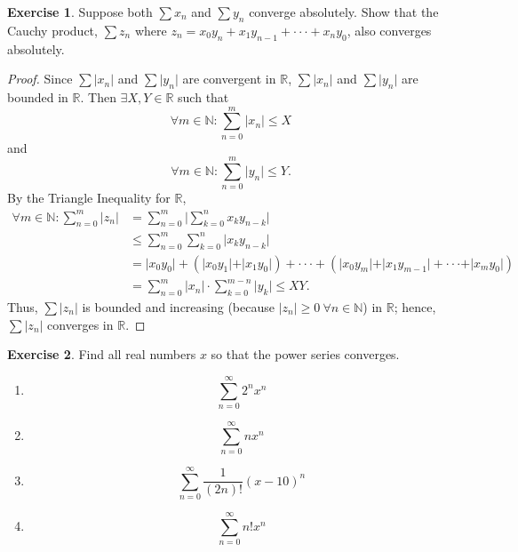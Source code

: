 \documentclass[12pt]{article}
\theoremstyle{definition}
\newtheorem{exercise}{Exercise}
\begin{document}
\thispagestyle{firstpage}

\begin{exercise}
    Suppose both \(\sum x_n\) and \(\sum y_n\) converge absolutely. Show that the Cauchy product, \(\sum z_n\) where \(z_n = x_0y_n + x_1y_{n - 1} + \cdot \cdot \cdot + x_ny_0\), also converges absolutely.  
\end{exercise}

\begin{proof}
    Since \(\sum \vert x_n \vert\) and \(\sum \vert y_n \vert\) are convergent in \(\mathbb{R}\), \(\sum \vert x_n \vert\) and \(\sum \vert y_n \vert\) are bounded in \(\mathbb{R}\). Then \(\exists X,Y \in \mathbb{R}\) such that
    \[
        \forall m \in \mathbb{N} : \sum_{n = 0}^{m}\vert x_n \vert \leq X
    \]
    and
    \[
        \forall m \in \mathbb{N} : \sum_{n = 0}^{m}\vert y_n \vert \leq Y.
    \]
    By the Triangle Inequality for \(\mathbb{R}\),
    \begin{align*}
        \forall m \in \mathbb{N} : \sum_{n = 0}^{m}\vert z_n \vert &= \sum_{n = 0}^{m}\bigg\vert \sum_{k = 0}^{n}x_ky_{n - k} \bigg\vert \\
        &\leq \sum_{n = 0}^{m}\sum_{k = 0}^{n}\vert x_ky_{n - k} \vert \\
        &= \vert x_0y_0 \vert + (\vert x_0y_1 \vert + \vert x_1y_0 \vert) + \cdot \cdot \cdot + (\vert x_0y_m \vert + \vert x_1y_{m - 1} \vert + \cdot \cdot \cdot + \vert x_my_0 \vert) \\
        &= \sum_{n = 0}^{m}\vert x_n \vert \cdot \sum_{k = 0}^{m - n}\vert y_k \vert \leq XY.
    \end{align*}
    Thus, \(\sum \vert z_n \vert\) is bounded and increasing (because \(\vert z_n \vert \geq 0 \ \forall n \in \mathbb{N}\)) in \(\mathbb{R}\); hence, \(\sum \vert z_n \vert\) converges in \(\mathbb{R}\).
\end{proof}

\begin{exercise}
    Find all real numbers \(x\) so that the power series converges.
    \begin{enumerate}[label=(\alph*)]
        \item \[
            \sum_{n = 0}^{\infty} 2^nx^n
        \]
        \item \[
            \sum_{n = 0}^{\infty} nx^n
        \]
        \item \[
            \sum_{n = 0}^{\infty}\frac{1}{(2n)!}(x - 10)^n
        \]
        \item \[
            \sum_{n = 0}^{\infty} n!x^n
        \]
    \end{enumerate}
\end{exercise}
\end{document}
